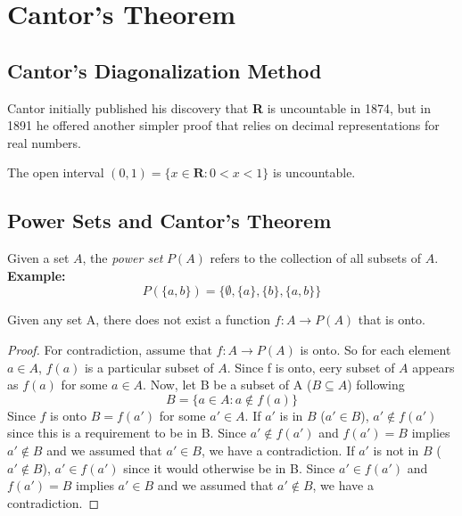 \section{Cantor's Theorem}
    \subsection*{Cantor's Diagonalization Method}
        Cantor initially published his discovery that \textbf{R} is uncountable in 1874, but in 1891 he offered another simpler proof that relies on decimal representations for real numbers.
        \begin{theorem}
            The open interval $(0, 1) = \{x \in \textbf{R}: 0 < x < 1\}$ is uncountable.
        \end{theorem} 
    \subsection*{Power Sets and Cantor's Theorem}
        Given a set $A$, the \textit{power set} $P(A)$ refers to the collection of all subsets of $A$.
        \textbf{Example:}
        \begin{equation*}
            P(\{a, b\}) = \{\emptyset, \{a\}, \{b\}, \{a, b\}\}
        \end{equation*}
        \begin{theorem}
            Given any set A, there does not exist a function $f: A \rightarrow P(A)$ that is onto.
        \end{theorem}
        \begin{proof}
            For contradiction, assume that $f: A \rightarrow P(A)$ is onto. So for each element $a \in A$, $f(a)$ is a particular subset of $A$. Since f is onto, eery subset of $A$ appears as $f(a)$ for some $a \in A$. Now, let B be a subset of A ($B \subseteq A$) following
            \begin{equation*}
                B = \{a \in A: a \notin f(a)\} 
            \end{equation*}
            Since $f$ is onto $B = f(a')$ for some $a' \in A$.
            \newline \newline
            If $a'$ is in $B$ ($a' \in B$), $a' \notin f(a')$ since this is a requirement to be in B. Since $a' \notin f(a')$ and $f(a') = B$ implies $a' \notin B$ and we assumed that $a' \in B$, we have a contradiction.
            \newline \newline
            If $a'$ is not in $B$ ($a' \notin B$), $a' \in f(a')$ since it would otherwise be in B. Since $a' \in f(a')$ and $f(a') = B$ implies $a' \in B$ and we assumed that $a' \notin B$, we have a contradiction.
        \end{proof}